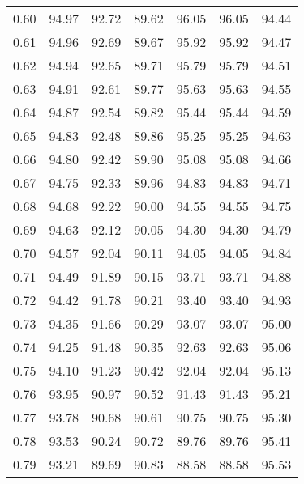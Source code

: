 \begin{tabular}{|c|c|c|c|c|c|c|}
      0.60 &     94.97 &     92.72 &      89.62 &   96.05 &      96.05 &         94.44 \\
      0.61 &     94.96 &     92.69 &      89.67 &   95.92 &      95.92 &         94.47 \\
      0.62 &     94.94 &     92.65 &      89.71 &   95.79 &      95.79 &         94.51 \\
      0.63 &     94.91 &     92.61 &      89.77 &   95.63 &      95.63 &         94.55 \\
      0.64 &     94.87 &     92.54 &      89.82 &   95.44 &      95.44 &         94.59 \\
      0.65 &     94.83 &     92.48 &      89.86 &   95.25 &      95.25 &         94.63 \\
      0.66 &     94.80 &     92.42 &      89.90 &   95.08 &      95.08 &         94.66 \\
      0.67 &     94.75 &     92.33 &      89.96 &   94.83 &      94.83 &         94.71 \\
      0.68 &     94.68 &     92.22 &      90.00 &   94.55 &      94.55 &         94.75 \\
      0.69 &     94.63 &     92.12 &      90.05 &   94.30 &      94.30 &         94.79 \\
      0.70 &     94.57 &     92.04 &      90.11 &   94.05 &      94.05 &         94.84 \\
      0.71 &     94.49 &     91.89 &      90.15 &   93.71 &      93.71 &         94.88 \\
      0.72 &     94.42 &     91.78 &      90.21 &   93.40 &      93.40 &         94.93 \\
      0.73 &     94.35 &     91.66 &      90.29 &   93.07 &      93.07 &         95.00 \\
      0.74 &     94.25 &     91.48 &      90.35 &   92.63 &      92.63 &         95.06 \\
      0.75 &     94.10 &     91.23 &      90.42 &   92.04 &      92.04 &         95.13 \\
      0.76 &     93.95 &     90.97 &      90.52 &   91.43 &      91.43 &         95.21 \\
      0.77 &     93.78 &     90.68 &      90.61 &   90.75 &      90.75 &         95.30 \\
      0.78 &     93.53 &     90.24 &      90.72 &   89.76 &      89.76 &         95.41 \\
      0.79 &     93.21 &     89.69 &      90.83 &   88.58 &      88.58 &         95.53 \\

\end{tabular}
